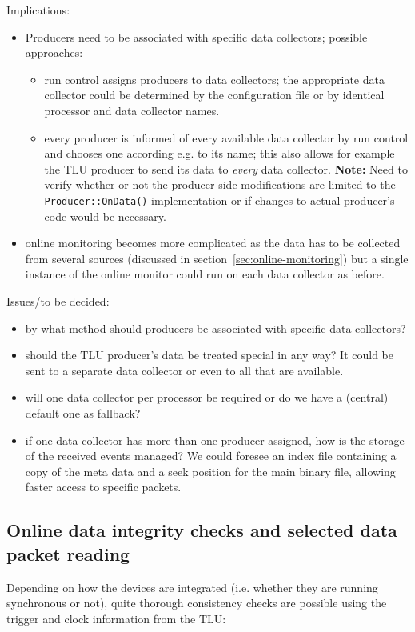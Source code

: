 \documentclass[paper=a4, fontsize=11pt]{scrartcl}	%
\numberwithin{equation}{section}		%
\numberwithin{figure}{section}			%
\numberwithin{table}{section}				%
\begin{document}
Implications:
\begin{itemize}
\item Producers need to be associated with specific data collectors;
  possible approaches:
  \begin{itemize}
  \item run control assigns producers to data
    collectors; the appropriate data collector could be determined by the
    configuration file or by identical processor and data collector names.
  \item every producer is informed of every available data collector
    by run control and chooses one according e.g. to its name; this
    also allows for example the TLU producer to send its data to
    \emph{every} data collector. \textbf{Note:} Need to verify whether
    or not the producer-side modifications are limited to the
    \texttt{Producer::OnData()} implementation or if changes to actual
    producer's code would be necessary.
  \end{itemize}
\item online monitoring becomes more complicated as the data has to be
  collected from several sources (discussed in
  section~\ref{sec:online-monitoring}) but a single instance of the online monitor
  could run on each data collector as before.
\end{itemize}

Issues/to be decided:
\begin{itemize}
\item by what method should producers be associated with specific data collectors?
\item should the TLU producer's data be treated special in any way? It
  could be sent to a separate data collector or even to all that are available.
\item will one data collector per processor be required or do we have
  a (central) default one as fallback?
\item if one data collector has more than one producer assigned, how
  is the storage of the received events managed? We could foresee an
  index file containing a copy of the meta data and a seek position
  for the main binary file, allowing faster access to specific packets.
\end{itemize}


\subsection{Online data integrity checks and selected data packet reading}
\label{sec:integrity}
Depending on how the devices are integrated (i.e. whether they are running
synchronous or not), quite thorough consistency checks are
possible using the trigger and clock information from the TLU:
\end{document}

